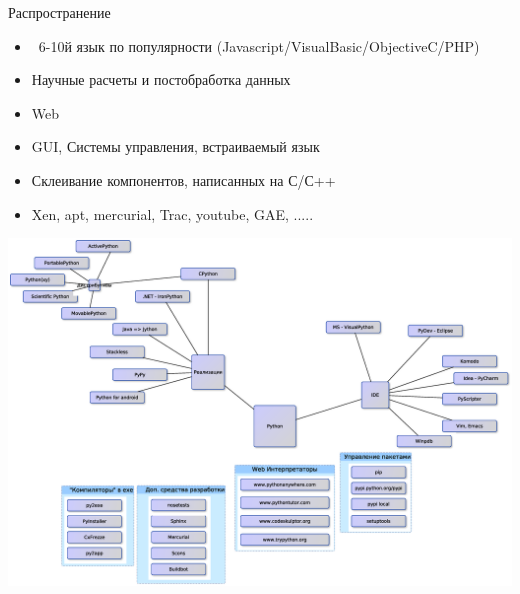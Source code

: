 \documentclass{article}
\begin{document}
\begin{center} Распространение \end{center}
\begin{itemize}
    \item ~6-10й язык по популярности (Javascript/VisualBasic/ObjectiveC/PHP)
    \item Научные расчеты и постобработка данных
    \item Web
    \item GUI, Системы управления, встраиваемый язык
    \item Склеивание компонентов, написанных на С/С++
    \item Xen, apt, mercurial, Trac, youtube, GAE, .....
\end{itemize}
\newpage

\begin{center} \includegraphics[scale=0.6]{images/python_ecosystem.eps} \end{center}
\newpage
\end{document}
